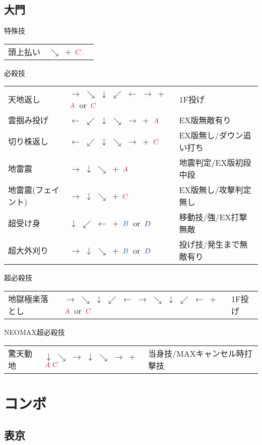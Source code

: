 \documentclass[a4j,11pt]{jarticle}
\def\A{\textcolor{Acolor}{A}}
\def\C{\textcolor{Ccolor}{C}}
\def\B{\textcolor{Bcolor}{B}}
\def\D{\textcolor{Dcolor}{D}}
\begin{document}
\subsection{大門}
\begin{itembox}[l]{特殊技}
\begin{tabular}{lll}
頭上払い&$\searrow$\ +\ $\C$&
\end{tabular}
\end{itembox}
\begin{itembox}[l]{必殺技}
\begin{tabular}{lll}
天地返し&$\rightarrow$ $\searrow$ $\downarrow$ $\swarrow$ $\leftarrow$ $\rightarrow$\ +\ $\A$\ or\ $\C$&1F投げ\\
雲掴み投げ&$\leftarrow$ $\swarrow$ $\downarrow$ $\searrow$ $\rightarrow$\ +\ $\A$&EX版無敵有り\\
切り株返し&$\leftarrow$ $\swarrow$ $\downarrow$ $\searrow$ $\rightarrow$\ +\ $\C$&EX版無し/ダウン追い打ち\\
地雷震&$\rightarrow$ $\downarrow$ $\searrow$\ +\ $\A$&地震判定/EX版初段中段\\
地雷震(フェイント)&$\rightarrow$ $\downarrow$ $\searrow$\ +\ $\C$&EX版無し/攻撃判定無し\\
超受け身&$\downarrow$ $\swarrow$ $\leftarrow$\ +\ $\B$\ or\ $\D$&移動技/強/EX打撃無敵\\
超大外刈り&$\rightarrow$ $\downarrow$ $\searrow$\ +\ $\B$\ or\ $\D$&投げ技/発生まで無敵有り
\end{tabular}
\end{itembox}
\begin{itembox}[l]{超必殺技}
\begin{tabular}{lll}
地獄極楽落とし&$\rightarrow$ $\searrow$ $\downarrow$ $\swarrow$ $\leftarrow$ $\rightarrow$ $\searrow$ $\downarrow$ $\swarrow$ $\leftarrow$\ +\ $\A$\ or\ $\C$&1F投げ
\end{tabular}
\end{itembox}
\begin{itembox}[l]{NEOMAX超必殺技}
\begin{tabular}{lll}
驚天動地&$\downarrow$ $\searrow$ $\rightarrow$ $\downarrow$ $\searrow$ $\rightarrow$\ +\ $\A\ \C$&当身技/MAXキャンセル時打撃技
\end{tabular}
\end{itembox}
\newpage
\section{コンボ}
\subsection{表京}
\end{document}
